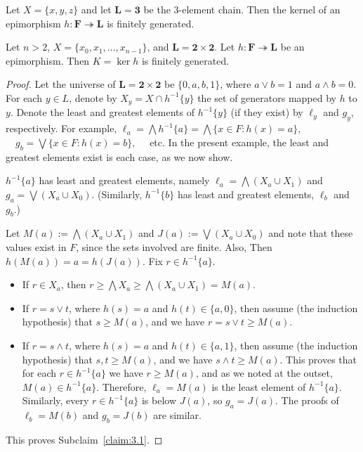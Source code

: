 \begin{prop}\label{prop:2} 
  Let $X = \{x, y, z\}$ and let $\mathbf{L} = \mathbf{3}$ be the 3-element chain.    
Then the kernel of an epimorphism $h\colon \mathbf{F} \twoheadrightarrow \mathbf{L}$ is finitely generated.
\end{prop}

\begin{prop}\label{prop:3} 
Let $n > 2$, $X = \{x_0, x_1,\dots, x_{n-1}\}$, and $\mathbf{L} = \mathbf{2} \times \mathbf{2}$.  
Let $h\colon \mathbf{F} \twoheadrightarrow \mathbf{L}$ be an epimorphism. Then $K = \operatorname{ker}h$ is finitely generated.  
\end{prop}
\begin{proof} 
  Let the universe of $\mathbf{L} = \mathbf{2} \times \mathbf{2}$ be $\{0, a, b, 1\}$, where $a\vee b = 1$ and $a\wedge b = 0$.  
For each $y \in L$, denote by $X_y = X \cap h^{-1}\{y\}$ the set of generators mapped by $h$ to $y$. 
Denote the least and greatest elements of $h^{-1}\{y\}$ (if they exist) by $\ell_y$ and $g_y$, respectively.  For example, 
$\ell_a = \bigwedge h^{-1}\{a\} = \bigwedge \{x\in F: h(x) = a\},\;$ $\quad g_b = \bigvee \{x\in F : h(x) = b\},\quad$ etc. 
In the present example, the least and greatest elements exist is each case, as we now show.

\begin{subclaim}\label{claim:3.1}
  $h^{-1}\{a\}$ has least and greatest elements, namely 
  $\ell_a = \bigwedge (X_a \cup X_1)$ and $g_a = \bigvee (X_a\cup X_0)$.  
  (Similarly, $h^{-1}\{b\}$ has least and greatest elements, $\ell_b$ and $g_b$.)
\end{subclaim}
Let $M(a):=\bigwedge (X_a\cup X_1)$ and $J(a):=\bigvee (X_a\cup X_0)$ and 
note that these values exist in $F$, since the sets involved are finite. Also, 
Then $h(M(a)) = a = h(J(a))$. Fix $r \in h^{-1}\{a\}$.  
\begin{itemize}
\item If $r \in X_a$, then $r\geqslant \bigwedge X_a \geqslant \bigwedge (X_a\cup X_1) = M(a)$.

\item If $r = s \vee t$, where $h(s) = a$ and $h(t) \in \{a, 0\}$, then    
assume (the induction hypothesis) that $s \geqslant M(a)$, and we have
$r = s\vee t \geqslant M(a)$.

\item If $r = s \wedge t$, where $h(s) = a$ and $h(t) \in \{a, 1\}$, then 
assume (the induction hypothesis) that $s, t \geqslant M(a)$, and we have 
$s \wedge t \geqslant M(a)$.
This proves that for each $r \in h^{-1}\{a\}$ we have $r \geqslant M(a)$, and 
as we noted at the outset, $M(a)\in h^{-1}\{a\}$. Therefore, $\ell_a = M(a)$ is 
the least element of $h^{-1}\{a\}$. Similarly, every $r \in h^{-1}\{a\}$ is 
below $J(a)$, so $g_a = J(a)$.  The proofs of $\ell_b = M(b)$ and $g_b = J(b)$ 
are similar.
\end{itemize}
This proves Subclaim~\ref{claim:3.1}.



\end{proof}
